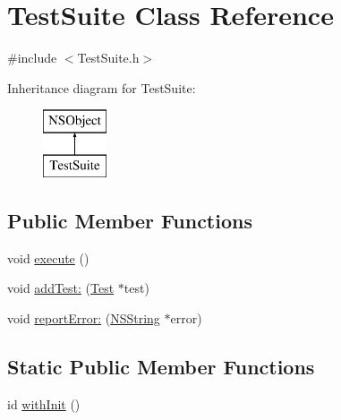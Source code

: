 \hypertarget{interface_test_suite}{
\section{\-Test\-Suite \-Class \-Reference}
\label{interface_test_suite}
}


{\ttfamily \#include $<$\-Test\-Suite.\-h$>$}

\-Inheritance diagram for \-Test\-Suite\-:\begin{figure}[H]
\begin{center}
\leavevmode
\includegraphics[height=2.000000cm]{interface_test_suite}
\end{center}
\end{figure}
\subsection*{\-Public \-Member \-Functions}
\begin{DoxyCompactItemize}
\item 
void \hyperlink{interface_test_suite_a826277e2dc89602f2acc43009e640e27}{execute} ()
\item 
void \hyperlink{interface_test_suite_ae626f4e348b00bf67315bdb3cb8b2eb8}{add\-Test\-:} (\hyperlink{interface_test}{\-Test} $\ast$test)
\item 
void \hyperlink{interface_test_suite_a91c84e1bd7702a974f5c582263632ece}{report\-Error\-:} (\hyperlink{class_n_s_string}{\-N\-S\-String} $\ast$error)
\end{DoxyCompactItemize}
\subsection*{\-Static \-Public \-Member \-Functions}
\begin{DoxyCompactItemize}
\item 
id \hyperlink{interface_test_suite_afd8da29d355156b4b6cc8ccf8fc96d20}{with\-Init} ()
\end{DoxyCompactItemize}
